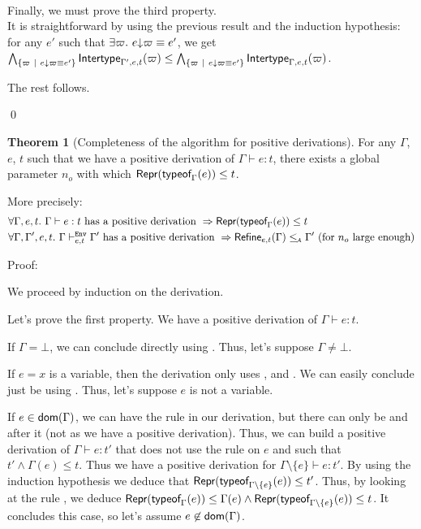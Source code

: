 \documentclass[a4paper]{article}
\theoremstyle{definition}
\newtheorem{theorem}{Theorem}
\begin{document}
  \ 

  Finally, we must prove the third property.\\
  It is straightforward by using the previous result and the induction hypothesis:\\
  for any $e'$ such that $\exists \varpi.\ e{\downarrow}\varpi \equiv e'$, we get
  $\bigwedge_{\{\varpi~|~ e{\downarrow}\varpi \equiv e'\}} \textsf{Intertype}_{\Gamma',e,t} (\varpi) \leq \bigwedge_{\{\varpi~|~ e{\downarrow}\varpi \equiv e'\}} \textsf{Intertype}_{\Gamma,e,t} (\varpi)$.

  The rest follows.

  \qed

  \begin{theorem}[Completeness of the algorithm for positive derivations]
    For any $\Gamma$, $e$, $t$ such that we have a positive derivation of $\Gamma \vdash e:t$,
    there exists a global parameter $n_o$ with which $\textsf{Repr}(\textsf{typeof}_{\Gamma}(e)) \leq t$.

    More precisely:
    \begin{align*}
      &\forall \Gamma, e, t.\ \Gamma \vdash e:t \text{ has a positive derivation } \Rightarrow \textsf{Repr}(\textsf{typeof}_{\Gamma}(e)) \leq t\\
      &\forall \Gamma, \Gamma', e, t.\ \Gamma \vdash^{\texttt{Env}}_{e,t} \Gamma' \text{ has a positive derivation } \Rightarrow \textsf{Refine}_{e,t}(\Gamma) \leq_{\!\scriptscriptstyle\mathcal{A}} \Gamma' \text{ (for $n_o$ large enough)}
    \end{align*}
  \end{theorem}

  Proof:

  We proceed by induction on the derivation.

  Let's prove the first property. We have a positive derivation of $\Gamma \vdash e:t$.

  If $\Gamma = \bot$, we can conclude directly using . Thus, let's suppose $\Gamma \neq \bot$.

  If $e=x$ is a variable, then the derivation only uses ,  and .
  We can easily conclude just be using . Thus, let's suppose $e$ is not a variable.

  If $e\in\textsf{dom}(\Gamma)$, we can have the rule  in our derivation, but there can only be
   and  after it (not  as we have a positive derivation).
  Thus, we can build a positive derivation of $\Gamma \vdash e:t'$ that does not use the rule  on $e$
  and such that $t'\land \Gamma(e) \leq t$. Thus we have a positive derivation for $\Gamma\setminus\{e\} \vdash e:t'$.
  By using the induction hypothesis we deduce that $\textsf{Repr}(\textsf{typeof}_{\Gamma\setminus\{e\}}(e)) \leq t'$.
  Thus, by looking at the rule ,
  we deduce $\textsf{Repr}(\textsf{typeof}_{\Gamma}(e)) \leq \Gamma(e) \land \textsf{Repr}(\textsf{typeof}_{\Gamma\setminus\{e\}}(e)) \leq t$.
  It concludes this case, so let's assume $e\not\in\textsf{dom}(\Gamma)$.
\end{document}

